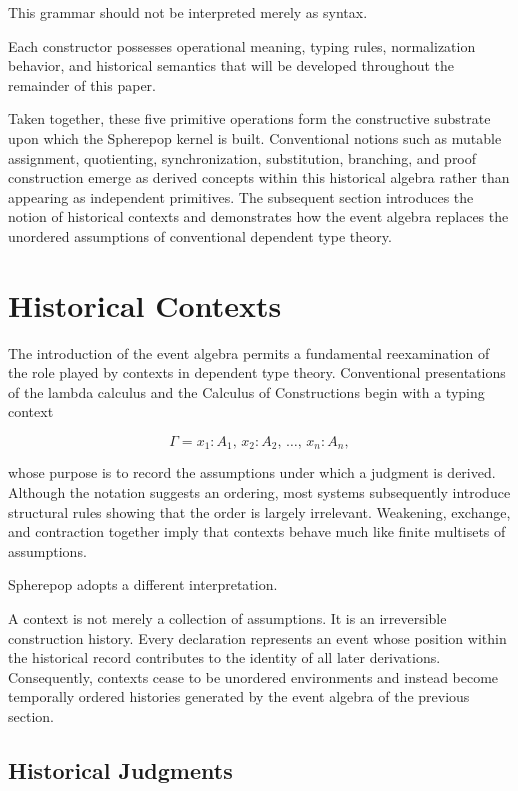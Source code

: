 \documentclass[12pt,oneside]{article}
\theoremstyle{definition}
\theoremstyle{remark}
\begin{document}
This grammar should not be interpreted merely as syntax.

Each constructor possesses operational meaning, typing rules, normalization
behavior, and historical semantics that will be developed throughout the
remainder of this paper.

Taken together, these five primitive operations form the constructive substrate
upon which the Spherepop kernel is built. Conventional notions such as mutable
assignment, quotienting, synchronization, substitution, branching, and proof
construction emerge as derived concepts within this historical algebra rather
than appearing as independent primitives. The subsequent section introduces the
notion of historical contexts and demonstrates how the event algebra replaces
the unordered assumptions of conventional dependent type theory.

\section{Historical Contexts}

The introduction of the event algebra permits a fundamental reexamination of the
role played by contexts in dependent type theory. Conventional presentations of
the lambda calculus and the Calculus of Constructions begin with a typing context

\[
\Gamma
=
x_1:A_1,\,
x_2:A_2,\,
\ldots,\,
x_n:A_n,
\]

whose purpose is to record the assumptions under which a judgment is derived.
Although the notation suggests an ordering, most systems subsequently introduce
structural rules showing that the order is largely irrelevant. Weakening,
exchange, and contraction together imply that contexts behave much like finite
multisets of assumptions.

Spherepop adopts a different interpretation.

A context is not merely a collection of assumptions. It is an irreversible
construction history. Every declaration represents an event whose position
within the historical record contributes to the identity of all later
derivations. Consequently, contexts cease to be unordered environments and
instead become temporally ordered histories generated by the event algebra of
the previous section.

\subsection{Historical Judgments}
\end{document}
